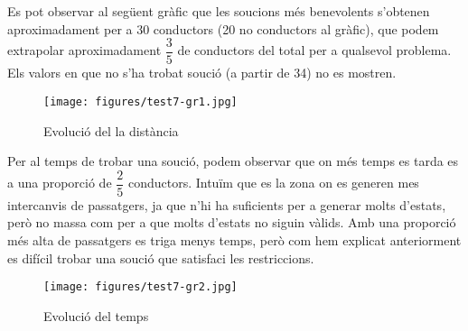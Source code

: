 Es pot observar al següent gràfic que les so\lgem ucions més benevolents s'obtenen aproximadament per a 30 conductors (20 no conductors al gràfic),
que podem extrapolar aproximadament $\dfrac{3}{5}$ de conductors del total per a qualsevol problema.
Els valors en que no s'ha trobat so\lgem ució (a partir de 34) no es mostren.

\begin{figure}[H]
\begin{center}
 \texttt{[image: figures/test7-gr1.jpg]}
 \label{test7-gr2}
\end{center}
\caption{Evolució del la distància}
\end{figure}

Per al temps de trobar una so\lgem ució, podem observar que on més temps es tarda es a una proporció de $\dfrac{2}{5}$ conductors.
Intuïm que es la zona on es generen mes intercanvis de passatgers, ja que n'hi ha suficients per a generar molts d'estats,
però no massa com per a que molts d'estats no siguin vàlids.
Amb una proporció més alta de passatgers es triga menys temps, però com hem explicat anteriorment es difícil trobar una so\lgem ució que satisfaci les restriccions.

\begin{figure}[H]
\begin{center}
 \texttt{[image: figures/test7-gr2.jpg]}
 \label{test7-gr2}
\end{center}
\caption{Evolució del temps}
\end{figure}
        
